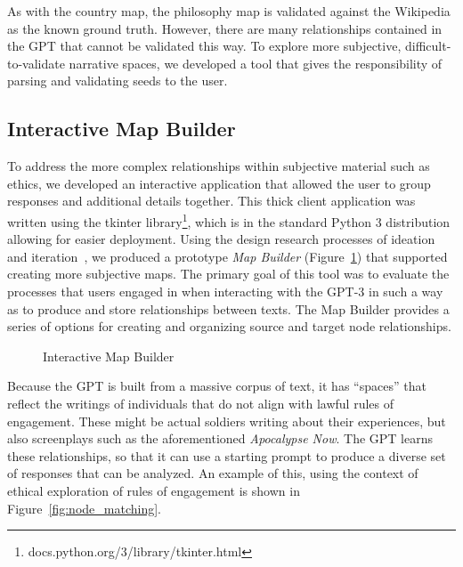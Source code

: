 \documentclass[11pt,dvipdfm]{article}
\begin{document}
As with the country map, the philosophy map is validated against the Wikipedia as the known ground truth. However, there are many relationships contained in the GPT that cannot be validated this way. To explore more subjective, difficult-to-validate narrative spaces, we developed a tool that gives the responsibility of parsing and validating seeds to the user.

\subsection{Interactive Map Builder}
\label{sec:interactive_builder}
To address the more complex relationships within subjective material such as ethics, we developed an interactive application that allowed the user to group responses and additional details together. This thick client application was written using the tkinter library\footnote{docs.python.org/3/library/tkinter.html}, which is in the standard Python 3 distribution allowing for easier deployment. Using the design research processes of ideation and iteration~\cite{zimmerman2007research}, we produced a prototype \textit{Map Builder} (Figure~\ref{fig:mapbulder3}) that supported creating more subjective maps. The primary goal of this tool was to evaluate the processes that users engaged in when interacting with the GPT-3 in such a way as to produce and store relationships between texts. The Map Builder provides a series of options for creating and organizing source and target node relationships.  

\begin{figure}
	\centering
	\caption{\label{fig:mapbulder3} Interactive Map Builder}
\end{figure}

Because the GPT is built from a massive corpus of text, it has \enquote{spaces} that reflect the writings of individuals that do not align with lawful rules of engagement. These might be actual soldiers writing about their experiences, but also screenplays such as the aforementioned \textit{Apocalypse Now}. The GPT learns these relationships, so that it can use a starting prompt to produce a diverse set of responses that can be analyzed. An example of this, using the context of ethical exploration of rules of engagement is shown in Figure~\ref{fig:node_matching}.
\end{document}
